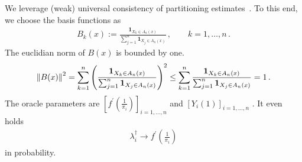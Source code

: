 We leverage (weak) universal consistency
of partitioning estimates~\cite{Gyorfi2002}.
To this end, we choose the basis functions as
\begin{gather}
  B_k(x)
  :=
  \frac{
  \mathbf{1}_{X_k \in A_n(x)}
  }{
  \sum_{j=1}^{n} 
  \mathbf{1}_{X_j \in A_n(x)}
  }
  \,,
  \qquad
  k=
  1,\ldots,n
  \,.
\end{gather}
The euclidian norm of 
$
  B(x)
$
is bounded by one.
\begin{gather}
  \left\lVert B(x)\right\rVert^2
  =
  \sum_{k=1}^{n} 
  \left( 
  \frac{
  \mathbf{1}_{X_k \in A_n(x)}
  }{
  \sum_{j=1}^{n} 
  \mathbf{1}_{X_j \in A_n(x)}
  }
  \right)
  ^2
  \le
  \sum_{k=1}^{n} 
  \frac{
  \mathbf{1}_{X_k \in A_n(x)}
  }{
  \sum_{j=1}^{n} 
  \mathbf{1}_{X_j \in A_n(x)}
  }
  =1
  \,.
\end{gather}
The oracle parameters are
$
  \left[ 
    f^{'}
    \left( 
      \frac{1}{\pi_i}
    \right)
  \right] _ { i = 1,\ldots,n }
$
and
$
  \left[ 
    Y_i(1)
  \right] _ { i = 1,\ldots,n }
$
.
It even holds
\begin{gather}
  \lambda ^ \dagger _ i \to 
    f^{'}
    \left( 
      \frac{1}{\pi_i}
    \right)
\end{gather}
in probability.

